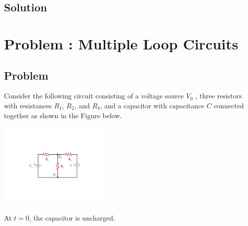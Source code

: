 \documentclass[solutions]{esg8022pset}
\begin{document}
\subsection{Solution}

\section{Problem \thesection: Multiple Loop Circuits}
\subsection{Problem}
  Consider the following circuit consisting of a voltage source $V_0$ , three resistors with resistances $R_1$, $R_2$, and $R_3$, and a capacitor with capacitance $C$ connected together as shown in the Figure below.
  \begin{center}\includegraphics[width=0.4\textwidth]{ps06_08_01}\end{center}
  At $t = 0$, the capacitor is uncharged.
\end{document}
